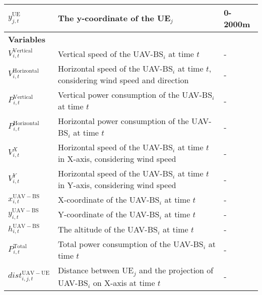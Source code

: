 \begin{table*}
\begin{adjustbox}{width=\columnwidth,center}
\begin{latin}
\begin{tabular}{|lll|}
\multicolumn{1}{|l|}{$y_{j,t}^{\mathrm{UE}}$}                      & \multicolumn{1}{l|}{The y-coordinate of the UE$_{j}$}                     &     0-2000m           \\ \hline


\multicolumn{3}{|l|}{\textbf{Variables}}                                   \\  \hline
\multicolumn{1}{|l|}{$V_{i,t}^{\mathrm{Vertical}}$}                      & \multicolumn{1}{l|}{Vertical speed of the UAV-BS$_{i}$ at time $t$}                     &  -               \\ 
\multicolumn{1}{|l|}{$V_{i,t}^{\mathrm{Horizontal}}$}                      & \multicolumn{1}{l|}{Horizontal speed of the UAV-BS$_{i}$ at time $t$, considering wind speed and direction}                     &     -            \\ 
\multicolumn{1}{|l|}{$P_{i,t}^{\mathrm{Vertical}}$}                      & \multicolumn{1}{l|}{Vertical power consumption of the UAV-BS$_{i}$ at time $t$}                     &  -               \\ 
\multicolumn{1}{|l|}{$P_{i,t}^{\mathrm{Horizontal}}$}                      & \multicolumn{1}{l|}{Horizontal power consumption of the UAV-BS$_{i}$ at time $t$}                     &     -            \\ 
\multicolumn{1}{|l|}{$V_{i,t}^{X}$}                      & \multicolumn{1}{l|}{Horizontal speed of the UAV-BS$_{i}$ at time $t$ in X-axis, considering wind speed}                     & -                \\ 
\multicolumn{1}{|l|}{$V_{i,t}^{Y}$}                      & \multicolumn{1}{l|}{Horizontal speed of the UAV-BS$_{i}$ at time $t$ in Y-axis, considering wind speed}                     &  -               \\ 
\multicolumn{1}{|l|}{$x_{i,t}^{\mathrm{UAV-BS}}$}                      & \multicolumn{1}{l|}{X-coordinate of the UAV-BS$_{i}$ at time $t$}                     &    -             \\ 
\multicolumn{1}{|l|}{$y_{i,t}^{\mathrm{UAV-BS}}$}                      & \multicolumn{1}{l|}{Y-coordinate of the UAV-BS$_{i}$ at time $t$}                     &  -               \\ 

\multicolumn{1}{|l|}{$h_{i,t}^{\mathrm{UAV-BS}}$}                      & \multicolumn{1}{l|}{The altitude of the UAV-BS$_{i}$ at time $t$}                     &    -             \\ 
\multicolumn{1}{|l|}{$P_{i,t}^{\mathrm{Total}}$}                      & \multicolumn{1}{l|}{Total power consumption of the UAV-BS$_{i}$ at time $t$}                     &  -               \\ 
\multicolumn{1}{|l|}{$dist_{i,j,t}^{\mathrm{UAV-UE}}$}                      & \multicolumn{1}{l|}{Distance between UE$_{j}$ and the projection of UAV-BS$_{i}$ on X-axis at time $t$}                     &    -             \\ 


\end{tabular}
\end{latin}
\end{adjustbox}
\end{table*}
